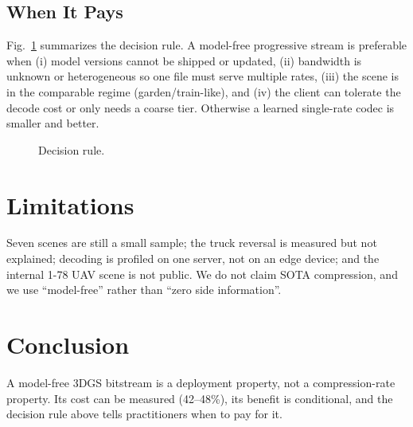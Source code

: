 \documentclass[conference]{IEEEtran}
\begin{document}
\subsection{When It Pays}
Fig.~\ref{fig:decision} summarizes the decision rule. A model-free progressive stream is preferable when (i) model versions cannot be shipped or updated, (ii) bandwidth is unknown or heterogeneous so one file must serve multiple rates, (iii) the scene is in the comparable regime (garden/train-like), and (iv) the client can tolerate the decode cost or only needs a coarse tier. Otherwise a learned single-rate codec is smaller and better.

\begin{figure}[t]
\centering
{}
\caption{Decision rule.}
\label{fig:decision}
\end{figure}

\section{Limitations}
\label{sec:limitations}
Seven scenes are still a small sample; the truck reversal is measured but not explained; decoding is profiled on one server, not on an edge device; and the internal 1-78 UAV scene is not public. We do not claim SOTA compression, and we use ``model-free'' rather than ``zero side information''.

\section{Conclusion}
\label{sec:conclusion}
A model-free 3DGS bitstream is a deployment property, not a compression-rate property. Its cost can be measured (42--48\%), its benefit is conditional, and the decision rule above tells practitioners when to pay for it.



\end{document}
